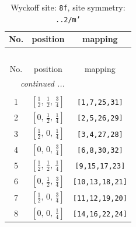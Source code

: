 \documentclass[fleqn,8pt]{jsarticle}
\begin{document}
\begin{longtable}{ccc}
\caption{Wyckoff site: {\tt 8f}, site symmetry: {\tt ..2/m'}}
 \\
 \hline \hline
No. & position & mapping \\ \hline \endfirsthead

\multicolumn{2}{l}{\tablename\ \thetable{}} \\
 \hline \hline
No. & position & mapping \\ \hline \endhead

 \hline \hline
\multicolumn{2}{r}{\footnotesize\it continued ...} \\ \endfoot

 \hline \hline
\multicolumn{2}{r}{} \\ \endlastfoot

1 & $\left[ \frac{1}{2},\, \frac{1}{2},\, \frac{3}{4} \right]$ & {\tt [1,7,25,31]} \\ \hline
2 & $\left[ 0,\, \frac{1}{2},\, \frac{1}{4} \right]$ & {\tt [2,5,26,29]} \\ \hline
3 & $\left[ \frac{1}{2},\, 0,\, \frac{1}{4} \right]$ & {\tt [3,4,27,28]} \\ \hline
4 & $\left[ 0,\, 0,\, \frac{3}{4} \right]$ & {\tt [6,8,30,32]} \\ \hline
5 & $\left[ \frac{1}{2},\, \frac{1}{2},\, \frac{1}{4} \right]$ & {\tt [9,15,17,23]} \\ \hline
6 & $\left[ 0,\, \frac{1}{2},\, \frac{3}{4} \right]$ & {\tt [10,13,18,21]} \\ \hline
7 & $\left[ \frac{1}{2},\, 0,\, \frac{3}{4} \right]$ & {\tt [11,12,19,20]} \\ \hline
8 & $\left[ 0,\, 0,\, \frac{1}{4} \right]$ & {\tt [14,16,22,24]} \\
\end{longtable}
\renewcommand{\arraystretch}{1.2}
\end{document}
